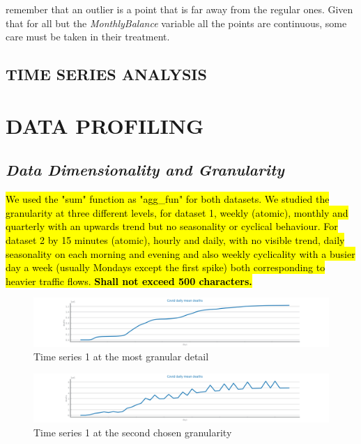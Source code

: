 \documentclass[10pt]{extarticle}
\newcommand{\ctext}[3][RGB]{%
  \begingroup
  \definecolor{hlcolor}{#1}{#2}\sethlcolor{hlcolor}%
  \hl{#3}%
  \endgroup
}
\begin{document}
remember that an outlier is a point that is far away from the regular ones. Given that for all but the \textit{MonthlyBalance} 
variable all the points are continuous, some care must be taken in their treatment.


\begin{center}
	\section*{\fontsize{0.75cm}{1cm}\selectfont TIME SERIES ANALYSIS}
\end{center}

\section{DATA PROFILING}

\subsection*{\textit{Data Dimensionality and Granularity}}
\ctext[RGB]{190,190,190}{We used the "sum" function as "agg\_fun" for both datasets. We studied the granularity at three different levels, for dataset 1, weekly (atomic), monthly and quarterly with an upwards trend but no seasonality or cyclical behaviour. For dataset 2 by 15 minutes (atomic), hourly and daily, with no visible trend, daily seasonality on each morning and evening and also weekly cyclicality with a busier day a week (usually Mondays except the first spike) both corresponding to heavier traffic flows. \textbf{Shall not exceed 500 characters.}}

\begin{figure}[H]
\centering\includegraphics[scale=0.5]{images/dataset1/time_series/Covid_granularity_aggregation_W.png}
\caption{Time series 1 at the most granular detail}
\end{figure}

\begin{figure}[H]
\centering\includegraphics[scale=0.5]{images/dataset1/time_series/Covid_granularity_aggregation_M.png}
\caption{Time series 1 at the second chosen granularity}
\end{figure}
\end{document}
